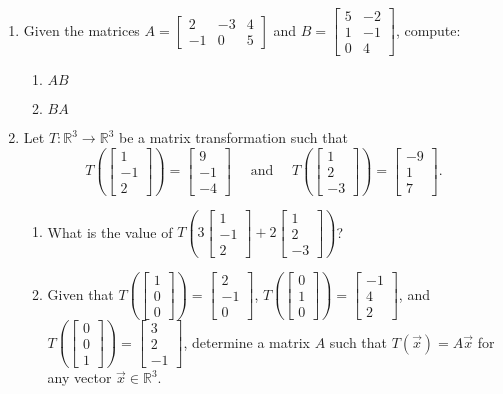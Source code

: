 \documentclass[12pt]{article}
\newcommand{\points}[1]{\marginpar{\hspace{24pt}[#1]}}
\newcommand{\R}{\mathbb{R}}
\newcommand{\bbm}{\begin{bmatrix}}
\newcommand{\ebm}{\end{bmatrix}}
\begin{document}
\begin{enumerate}
\newpage

\item Given the matrices $A = \bbm 2&-3&4\\-1&0&5\ebm$ and $B = \bbm 5&-2\\1&-1\\0&4\ebm$, compute:
\begin{enumerate}
 \item $AB$ \points{4}

\vspace{3.5in}

 \item $BA$ \points{4}
\end{enumerate}

\newpage

\item Let $T:\R^3\to \R^3$ be a matrix transformation such that
 \[T\left(\bbm 1\\-1\\2\ebm\right) = \bbm 9\\-1\\-4\ebm \quad \text{ and } \quad T\left(\bbm 1\\2\\-3\ebm\right) = \bbm -9\\1\\7\ebm.\]
\begin{enumerate}
 \item What is the value of $T\left(3\bbm 1\\-1\\2\ebm+2\bbm 1\\2\\-3\ebm\right)$? \points{3}

\vspace{3in}

 \item Given that $T\left(\bbm 1\\0\\0\ebm\right) = \bbm 2\\-1\\0\ebm$, $T\left(\bbm 0\\1\\0\ebm\right) = \bbm -1\\4\\2\ebm$, and $T\left(\bbm 0\\0\\1\ebm\right) = \bbm 3\\2\\-1\ebm$, determine a matrix $A$ such that $T(\vec{x}) = A\vec{x}$ for any vector $\vec{x}\in\R^3$. \points{2}
\end{enumerate}


\end{enumerate}
\end{document}
